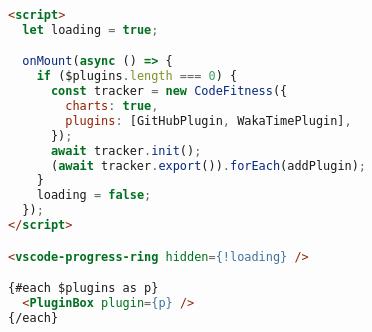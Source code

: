 \begin{figure}%
	\centering
	\begin{lstlisting}[language=html]
<script>
  let loading = true;

  onMount(async () => {
    if ($plugins.length === 0) {
      const tracker = new CodeFitness({
        charts: true,
        plugins: [GitHubPlugin, WakaTimePlugin],
      });
      await tracker.init();
      (await tracker.export()).forEach(addPlugin);
    }
    loading = false;
  });
</script>

<vscode-progress-ring hidden={!loading} />

{#each $plugins as p}
  <PluginBox plugin={p} />
{/each}
	\end{lstlisting}
	\caption{}
	\label{code:pluginsSvelte}
\end{figure}

